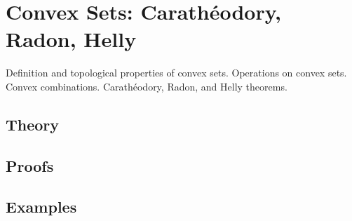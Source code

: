 
\section{Convex Sets: Carathéodory, Radon, Helly}
\label{sec:2.4.01-convex-sets}

\begin{ticket}
Definition and topological properties of convex sets. Operations on convex sets. Convex combinations. Carathéodory, Radon, and Helly theorems.
\end{ticket}

\subsection*{Theory}

\subsection*{Proofs}

\subsection*{Examples}
